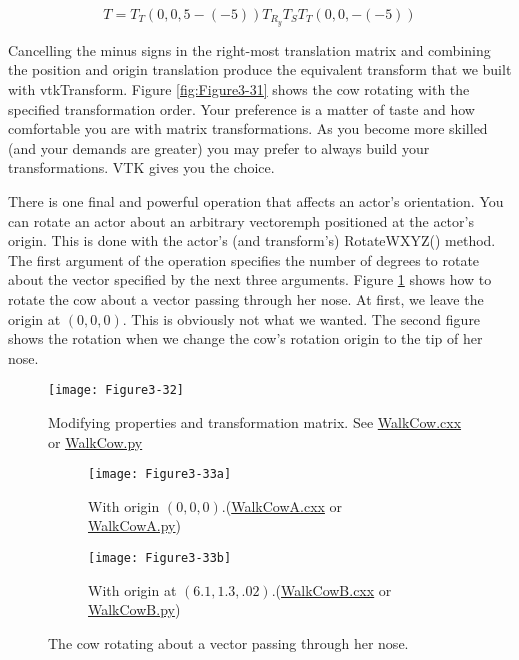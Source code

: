 \begin{equation}\label{eq:3.16}
T=T_T(0,0,5-(-5))T_{R_y}T_ST_T(0,0,-(-5))
\end{equation}

\noindent Cancelling the minus signs in the right-most translation matrix and combining the position and origin translation produce the equivalent transform that we built with vtkTransform. Figure \ref{fig:Figure3-31} shows the cow rotating with the specified transformation order. Your preference is a matter of taste and how comfortable you are with matrix transformations. As you become more skilled (and your demands are greater) you may prefer to always build your transformations. VTK gives you the choice.

There is one final and powerful operation that affects an actor's orientation. You can rotate an actor about an arbitrary vectoremph positioned at the actor's origin. This is done with the actor's (and transform's) RotateWXYZ() method. The first argument of the operation specifies the number of degrees to rotate about the vector specified by the next three arguments. Figure \ref{fig:Figure3-32} shows how to rotate the cow about a vector passing through her nose. At first, we leave the origin at $(0,0,0)$. This is obviously not what we wanted. The second figure shows the rotation when we change the cow's rotation origin to the tip of her nose.

\begin{figure}[!htb]
  \centering
  \texttt{[image: Figure3-32]}\\
  \caption{Modifying properties and transformation matrix. See \href{https://lorensen.github.io/VTKExamples/site/Cxx/Rendering/WalkCow/}{WalkCow.cxx} or \href{https://lorensen.github.io/VTKExamples/site/Python/Rendering/WalkCow/}{WalkCow.py}}\label{fig:Figure3-32}
\end{figure}

\begin{figure}
\begin{subfigure}[h]{0.48\linewidth}
\texttt{[image: Figure3-33a]}
\caption{With origin $(0,0,0)$.(\href{https://lorensen.github.io/VTKExamples/site/Cxx/Rendering/WalkCowA/}{WalkCowA.cxx} or \href{https://lorensen.github.io/VTKExamples/site/Python/Rendering/WalkCowA/}{WalkCowA.py})}\label{fig:Figure3-33a}
\end{subfigure}
\hfill
\begin{subfigure}[h]{0.48\linewidth}
\texttt{[image: Figure3-33b]}
\caption{With origin at $(6.1,1.3,.02)$.(\href{https://lorensen.github.io/VTKExamples/site/Cxx/Rendering/WalkCowB/}{WalkCowB.cxx} or \href{https://lorensen.github.io/VTKExamples/site/Python/Rendering/WalkCowB/}{WalkCowB.py})}\label{fig:Figure3-33b}
\end{subfigure}%
\caption{The cow rotating about a vector passing through her nose.}\label{fig:Figure3-33}
\end{figure}


